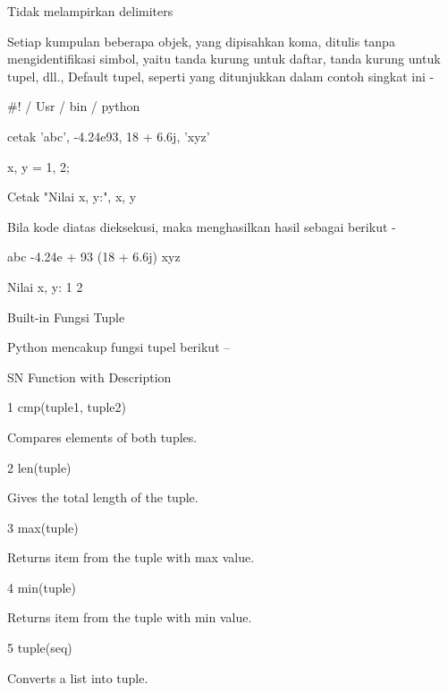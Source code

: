 Tidak melampirkan delimiters \par
Setiap kumpulan beberapa objek, yang dipisahkan koma, ditulis tanpa mengidentifikasi simbol, yaitu tanda kurung untuk daftar, tanda kurung untuk tupel, dll., Default tupel, seperti yang ditunjukkan dalam contoh singkat ini - \par
 $  \#  $! / Usr / bin / python \par
\vspace{12pt}
cetak 'abc', -4.24e93, 18 + 6.6j, 'xyz' \par
x, y = 1, 2; \par
Cetak "Nilai x, y:", x, y \par
Bila kode diatas dieksekusi, maka menghasilkan hasil sebagai berikut - \par
abc -4.24e + 93 (18 + 6.6j) xyz \par
Nilai x, y: 1 2 \par
Built-in Fungsi Tuple \par
Python mencakup fungsi tupel berikut – \par
\vspace{12pt}
\vspace{12pt}
\vspace{12pt}
SN \hspace*{0.5in} Function with Description \par
1 \hspace*{0.5in} cmp(tuple1, tuple2) \par
\vspace{12pt}
Compares elements of both tuples. \par
2 \hspace*{0.5in} len(tuple) \par
\vspace{12pt}
Gives the total length of the tuple. \par
3 \hspace*{0.5in} max(tuple) \par
\vspace{12pt}
Returns item from the tuple with max value. \par
4 \hspace*{0.5in} min(tuple) \par
\vspace{12pt}
Returns item from the tuple with min value. \par
5 \hspace*{0.5in} tuple(seq) \par
\vspace{12pt}
Converts a list into tuple. \par
